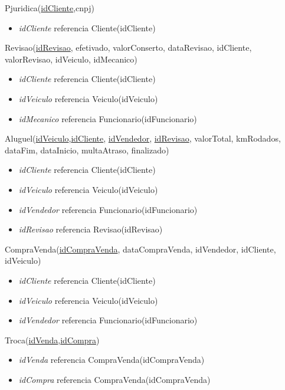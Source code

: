 \documentclass[brazil, a4paper,12pt]{article}
\begin{document}
\vspace{1cm}

Pjuridica(\underline{idCliente},cnpj)
\begin{itemize}
\item \emph{idCliente} referencia Cliente(idCliente)
\end{itemize}

\vspace{1cm}

Revisao(\underline{idRevisao}, efetivado, valorConserto, dataRevisao, idCliente, valorRevisao, idVeiculo, idMecanico)

\begin{itemize}
\item \emph{idCliente} referencia Cliente(idCliente)
\item \emph{idVeiculo} referencia Veiculo(idVeiculo)
\item \emph{idMecanico} referencia Funcionario(idFuncionario)
\end{itemize}

\vspace{1cm}

Aluguel(\underline{idVeiculo},\underline{idCliente}, \underline{idVendedor}, \underline{idRevisao}, valorTotal, kmRodados, dataFim, dataInicio, multaAtraso, finalizado)

\begin{itemize}
\item \emph{idCliente} referencia Cliente(idCliente)
\item \emph{idVeiculo} referencia Veiculo(idVeiculo)
\item \emph{idVendedor} referencia Funcionario(idFuncionario)
\item \emph{idRevisao} referencia Revisao(idRevisao)
\end{itemize}

\vspace{1cm}

CompraVenda(\underline{idCompraVenda}, dataCompraVenda, idVendedor, idCliente, idVeiculo)

\begin{itemize}
\item \emph{idCliente} referencia Cliente(idCliente)
\item \emph{idVeiculo} referencia Veiculo(idVeiculo)
\item \emph{idVendedor} referencia Funcionario(idFuncionario)
\end{itemize}

\vspace{1cm}

Troca(\underline{idVenda},\underline{idCompra})
\begin{itemize}
\item \emph{idVenda} referencia CompraVenda(idCompraVenda)
\item \emph{idCompra} referencia CompraVenda(idCompraVenda)
\end{itemize}
\end{document}

